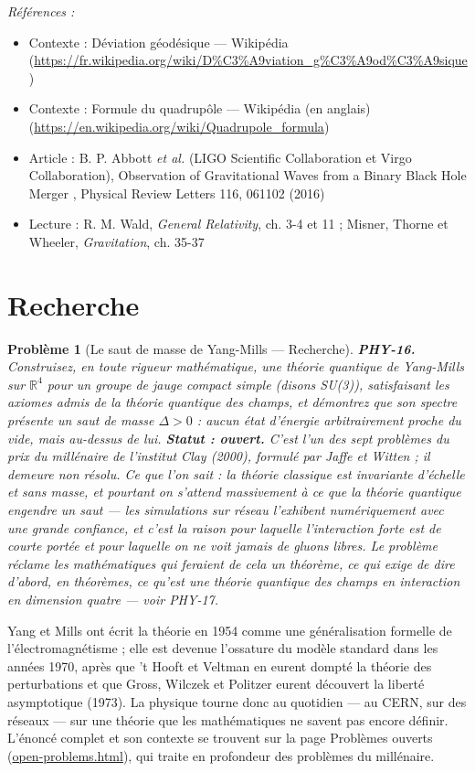 \documentclass[11pt]{article}
\newtheorem{problem}{Problème}
\newenvironment{refs}{\par\small\noindent\emph{Références :}\begin{itemize}\setlength\itemsep{0pt}}{\end{itemize}\normalsize}
\begin{document}
\begin{refs}
\item Contexte : Déviation géodésique --- Wikipédia (\url{https://fr.wikipedia.org/wiki/D%C3%A9viation_g%C3%A9od%C3%A9sique})
\item Contexte : Formule du quadrupôle --- Wikipédia (en anglais) (\url{https://en.wikipedia.org/wiki/Quadrupole_formula})
\item Article : B. P. Abbott \textit{et al.} (LIGO Scientific Collaboration et Virgo Collaboration), \og{} Observation of Gravitational Waves from a Binary Black Hole Merger \fg{}, Physical Review Letters 116, 061102 (2016)
\item Lecture : R. M. Wald, \textit{General Relativity}, ch. 3-4 et 11 ; Misner, Thorne et Wheeler, \textit{Gravitation}, ch. 35-37
\end{refs}

\bigskip


\section*{Recherche}

\begin{problem}[{Le saut de masse de Yang-Mills --- Recherche}]
\textbf{PHY-16.} Construisez, en toute rigueur mathématique, une théorie
quantique de Yang-Mills sur $\mathbb{R}^4$ pour un groupe de jauge compact simple (disons SU(3)),
satisfaisant les axiomes admis de la théorie quantique des champs, et démontrez que son spectre
présente un saut de masse $\Delta > 0$ : aucun état d'énergie arbitrairement proche du vide,
mais au-dessus de lui. \textbf{Statut : ouvert.} C'est l'un des sept problèmes du prix du millénaire
de l'institut Clay (2000), formulé par Jaffe et Witten ; il demeure non résolu. Ce que l'on sait :
la théorie classique est invariante d'échelle et sans masse, et pourtant on s'attend massivement à
ce que la théorie quantique engendre un saut --- les simulations sur réseau l'exhibent
numériquement avec une grande confiance, et c'est la raison pour laquelle l'interaction forte est
de courte portée et pour laquelle on ne voit jamais de gluons libres. Le problème réclame les
mathématiques qui feraient de cela un théorème, ce qui exige de dire d'abord, en théorèmes, ce
qu'\textit{est} une théorie quantique des champs en interaction en dimension quatre --- voir
PHY-17.
\end{problem}

\noindent Yang et Mills ont écrit la théorie en 1954 comme une généralisation formelle de
l'électromagnétisme ; elle est devenue l'ossature du modèle standard dans les années 1970, après
que 't Hooft et Veltman en eurent dompté la théorie des perturbations et que Gross, Wilczek et
Politzer eurent découvert la liberté asymptotique (1973). La physique tourne donc au quotidien ---
au CERN, sur des réseaux --- sur une théorie que les mathématiques ne savent pas encore définir.
L'énoncé complet et son contexte se trouvent sur la page
Problèmes ouverts (\url{open-problems.html}), qui traite en profondeur des problèmes du
millénaire.
\end{document}
